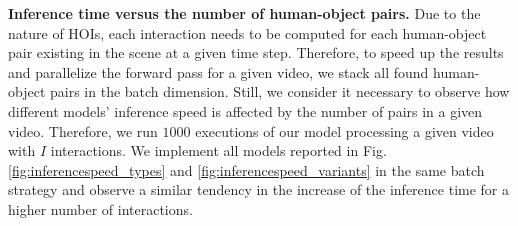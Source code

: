 \documentclass{article}
\begin{document}
\textbf{Inference time versus the number of human-object pairs.} Due to the nature of HOIs, each interaction needs to be computed for each human-object pair existing in the scene at a given time step. Therefore, to speed up the results and parallelize the forward pass for a given video, we stack all found human-object pairs in the batch dimension. Still, we consider it necessary to observe how different models' inference speed is affected by the number of pairs in a given video. Therefore, we run $1000$ executions of our model processing a given video with $I$ interactions. We implement all models reported in Fig. \ref{fig:inferencespeed_types} and \ref{fig:inferencespeed_variants} in the same batch strategy and observe a similar tendency in the increase of the inference time for a higher number of interactions.

\begin{figure}
    \centering
\end{figure}
\end{document}
